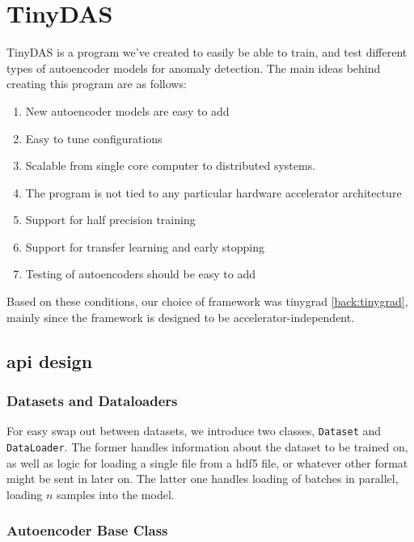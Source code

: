 \section{TinyDAS}

TinyDAS is a program we've created to easily be able to train, and test different types of autoencoder models for anomaly detection. The main ideas behind creating this program are as follows:

\begin{enumerate}
    \item New autoencoder models are easy to add
    \item Easy to tune configurations
    \item Scalable from single core computer to distributed systems.
    \item The program is not tied to any particular hardware accelerator architecture
    \item Support for half precision training
    \item Support for transfer learning and early stopping
    \item Testing of autoencoders should be easy to add
\end{enumerate}

Based on these conditions, our choice of framework was tinygrad \ref{back:tinygrad}, mainly since the framework is designed to be accelerator-independent.

\subsection{\acrshort{api} design}

\subsubsection{Datasets and Dataloaders}

For easy swap out between datasets, we introduce two classes, \texttt{Dataset} and \texttt{DataLoader}. The former handles information about the dataset to be trained on, as well as logic for loading a single file from a \acrshort{hdf5} file, or whatever other format might be sent in later on. The latter one handles loading of batches in parallel, loading $n$ samples into the model.

\subsubsection{Autoencoder Base Class}

